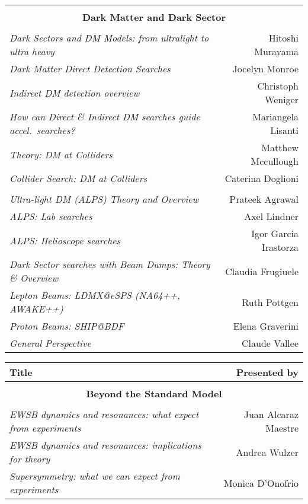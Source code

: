 \begin{flushleft}
\begin{tabular}{lr}
\vspace*{-3mm} & \\
\multicolumn{2}{c}{\bf Dark Matter and Dark Sector} \\
\vspace*{-3mm} & \\
\it Dark Sectors and DM Models: from ultralight to ultra heavy & Hitoshi Murayama \\
\it Dark Matter Direct Detection Searches & Jocelyn Monroe \\
\it Indirect DM detection overview & Christoph Weniger \\
\it How can Direct \& Indirect DM searches guide accel.\ searches? & Mariangela Lisanti \\
\it Theory: DM at Colliders & Matthew Mccullough \\
\it Collider Search: DM at Colliders & Caterina Doglioni \\
\vspace*{-3mm} & \\
\it Ultra-light DM (ALPS) Theory and Overview & Prateek Agrawal \\
\it ALPS: Lab searches & Axel Lindner \\
\it ALPS: Helioscope searches & Igor Garcia Irastorza \\
\it Dark Sector searches with Beam Dumps: Theory \& Overview & Claudia Frugiuele \\
\it Lepton Beams: LDMX@eSPS (NA64++, AWAKE++) & Ruth Pottgen \\
\it Proton Beams: SHIP@BDF & Elena Graverini \\
\it General Perspective & Claude Vallee \\ \hline
\end{tabular}
\vfill \newpage
\begin{tabular}{lr}
\bf Title & \bf Presented by \\ \hline 
\vspace*{-3mm} & \\
\multicolumn{2}{c}{\bf Beyond the Standard Model} \\
\vspace*{-3mm} & \\
\it EWSB dynamics and resonances: what expect from experiments & Juan Alcaraz Maestre \\
\it EWSB dynamics and resonances: implications for theory & Andrea Wulzer \\
\it Supersymmetry: what we can expect from experiments & Monica D'Onofrio \\

\end{tabular}
\end{flushleft}
